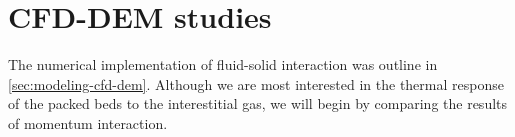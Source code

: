 \chapter{CFD-DEM studies}\label{sec:cfd-dem-studies}
The numerical implementation of fluid-solid interaction was outline in \cref{sec:modeling-cfd-dem}. Although we are most interested in the thermal response of the packed beds to the interestitial gas, we will begin by comparing the results of momentum interaction. 


